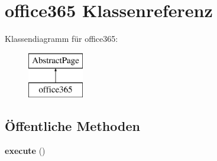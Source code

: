 \hypertarget{classoffice365}{}\section{office365 Klassenreferenz}
\label{classoffice365}
Klassendiagramm für office365\+:\begin{figure}[H]
\begin{center}
\leavevmode
\includegraphics[height=2.000000cm]{classoffice365}
\end{center}
\end{figure}
\subsection*{Öffentliche Methoden}
\begin{DoxyCompactItemize}
\item 
\mbox{\label{classoffice365_ad3fed9dc88c85005a668a12b0ed4b6d7}} 
{\bfseries execute} ()
\end{DoxyCompactItemize}
